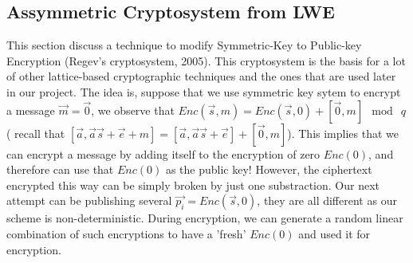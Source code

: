 \subsection{Assymmetric Cryptosystem from LWE}
\label{sec:asymLWE}
This section discuss a technique to modify Symmetric-Key to Public-key
Encryption (Regev's cryptosystem, 2005). This cryptosystem is the basis for a
lot of other lattice-based cryptographic techniques and the ones that are used
later in our project. The idea is, suppose that we use symmetric key sytem to
encrypt a message $\vec{m} = \vec{0}$, we observe that
$Enc(\vec{s}, m) = Enc(\vec{s},0) + [\vec{0}, m] \mod \ q$ ( recall that
$[\vec{a}, \vec{a}\vec{s} + \vec{e} + m] = [\vec{a}, \vec{a}\vec{s} + \vec{e}] +
[\vec{0}, m]$). This implies that we can encrypt a message by adding itself to
the encryption of zero $Enc(0)$, and therefore can use that $Enc(0)$ as the
public key! However, the ciphertext encrypted this way can be simply broken by
just one substraction. Our next attempt can be publishing several
$\vec{p_i} = Enc(\vec{s}, 0)$, they are all different as our scheme is
non-deterministic. During encryption, we can generate a random linear
combination of such encryptions to have a 'fresh' $Enc(0)$ and used it for
encryption.
